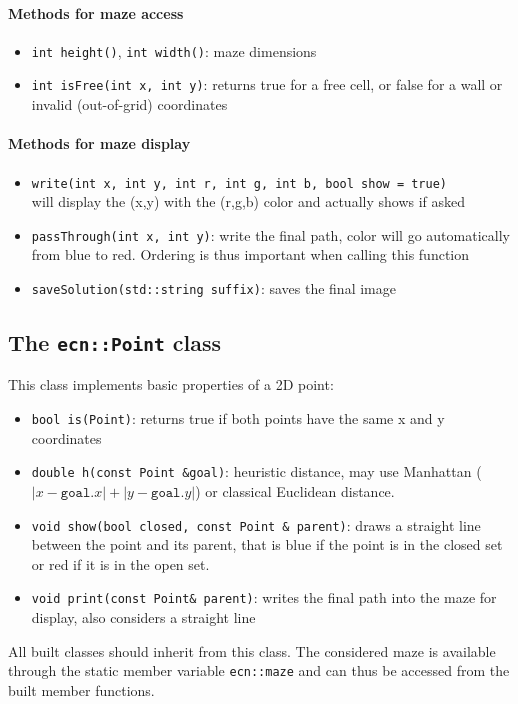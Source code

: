 \documentclass{ecnreport}
\begin{document}
\paragraph{Methods for maze access}
\begin{itemize}
 \item \texttt{int height()}, \texttt{int width()}: maze dimensions
 \item \texttt{int isFree(int x, int y)}: returns true for a free cell, or false for a wall or invalid (out-of-grid) coordinates
\end{itemize}

\paragraph{Methods for maze display}
\begin{itemize}
 \item \texttt{write(int x, int y, int r, int g, int b, bool show = true)}\\
    will display the (x,y) with the (r,g,b) color and actually shows if asked
 \item \texttt{passThrough(int x, int y)}: write the final path, color will go automatically from blue to red. 
 Ordering is thus important when calling this function
 \item \texttt{saveSolution(std::string suffix)}: saves the final image
\end{itemize}

\subsection{The \texttt{ecn::Point} class}\label{ptClass}

This class implements basic properties of a 2D point:

\begin{itemize}
 \item \texttt{bool is(Point)}: returns true if both points have the same x and y coordinates
 \item \texttt{double h(const Point \&goal)}: heuristic distance, may use Manhattan
 ($|x-\texttt{goal}.x| + |y-\texttt{goal}.y|$) or classical Euclidean distance.
 \item \texttt{void show(bool closed, const Point \& parent)}: draws a straight line between the point and its parent, that
 is blue if the point is in the closed set or red if it is in the open set.
 \item \texttt{void print(const Point\& parent)}: writes the final path into the maze for display, also considers a straight line
\end{itemize}
All built classes should inherit from this class. The considered maze is available through the static member variable \texttt{ecn::maze} and can thus
be accessed from the built member functions.
\end{document}
